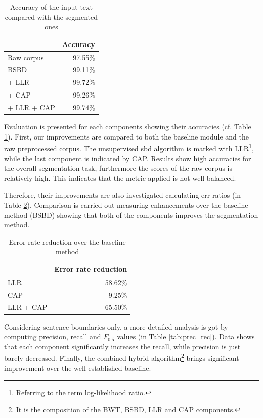 \begin{table}[H]
\centering
\caption{Accuracy of the input text compared with the segmented ones}
\label{tab:base}
\begin{tabular}{ l  r } 
\hline
& Accuracy \\ 
\hline
Raw corpus  & 97.55\% \\
BSBD & 99.11\% \\
\hspace{0.2cm}+ LLR & 99.72\% \\
\hspace{0.2cm}+ CAP & 99.26\% \\
\hspace{0.2cm}+ LLR + CAP & 99.74\% \\
\hline
\end{tabular}
\end{table}

Evaluation is presented for each components showing their accuracies (cf. Table \ref{tab:base}).
First, our improvements are compared to both the baseline module and the raw preprocessed corpus.
The unsupervised \acrshort{sbd} algorithm is marked with LLR\footnote{Referring to the term log-likelihood ratio.}, while the last component is indicated by CAP.
Results show high accuracies for the overall segmentation task, furthermore the scores of the raw corpus is relatively high.
This indicates that the metric applied is not well balanced.

Therefore, their improvements are also investigated calculating \acrlong{err} ratios (in Table \ref{tab:reduction}). 
Comparison is carried out measuring enhancements over the baseline method (BSBD) showing that both of the components improves the segmentation method.

\begin{table}[H]
\centering
\caption{Error rate reduction over the baseline method}
\label{tab:reduction}
\begin{tabular}{ l  r } 
\hline
& Error rate reduction\\
\hline
LLR & 58.62\% \\
CAP & 9.25\% \\
LLR + CAP & 65.50\% \\
\hline
\end{tabular}
\end{table}

Considering sentence boundaries only, a more detailed analysis is got by computing precision, recall and $F_{0.5}$ values (in Table \ref{tab:prec_rec}). 
Data shows that each component significantly increases the recall, while precision is just barely decreased. 
Finally, the combined hybrid algorithm\footnote{It is the composition of the BWT, BSBD, LLR and CAP components.} brings significant improvement over the well-established baseline.

